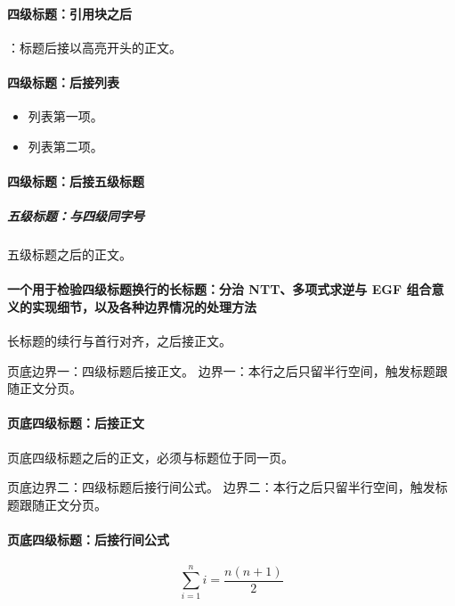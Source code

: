 \documentclass{article}
\newcommand{\FillPageBottom}{%
  \par\vspace*{\dimexpr\pagegoal-\pagetotal-.5\baselineskip\relax}}
\begin{document}
\paragraph{四级标题：引用块之后}

：标题后接以高亮开头的正文。

\paragraph{四级标题：后接列表}

\begin{itemize}
\item 列表第一项。
\item 列表第二项。
\end{itemize}

\paragraph{四级标题：后接五级标题}

\subparagraph{五级标题：与四级同字号}

五级标题之后的正文。

\paragraph{一个用于检验四级标题换行的长标题：分治 NTT、多项式求逆与 EGF 组合意义的实现细节，以及各种边界情况的处理方法}

长标题的续行与首行对齐，之后接正文。

\newpage
页底边界一：四级标题后接正文。
边界一：本行之后只留半行空间，触发标题跟随正文分页。
\FillPageBottom

\paragraph{页底四级标题：后接正文}

页底四级标题之后的正文，必须与标题位于同一页。

\newpage
页底边界二：四级标题后接行间公式。
边界二：本行之后只留半行空间，触发标题跟随正文分页。
\FillPageBottom

\paragraph{页底四级标题：后接行间公式}

\[
\sum_{i = 1}^{n} i = \frac{n (n + 1)}{2}
\]
\end{document}
